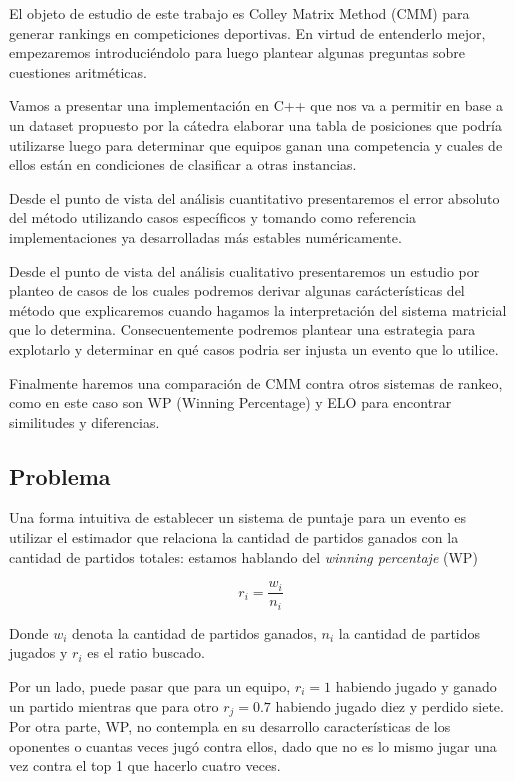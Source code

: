 El objeto de estudio de este trabajo es Colley Matrix Method (CMM) para generar rankings en competiciones deportivas. En virtud de entenderlo mejor, empezaremos introduciéndolo para luego plantear algunas preguntas sobre cuestiones aritméticas.

Vamos a presentar una implementación en C++ que nos va a permitir en base a un dataset propuesto por la cátedra elaborar una tabla de posiciones que podría utilizarse luego para determinar que equipos ganan una competencia y cuales de ellos están en condiciones de clasificar a otras instancias.

Desde el punto de vista del análisis cuantitativo presentaremos el error absoluto del método utilizando casos específicos y tomando como referencia implementaciones ya desarrolladas más estables numéricamente.

Desde el punto de vista del análisis cualitativo presentaremos un estudio por planteo de casos de los cuales podremos derivar algunas carácterísticas del método que explicaremos cuando hagamos la interpretación del sistema matricial que lo determina. Consecuentemente podremos plantear una estrategia para explotarlo y determinar en qué casos podria ser injusta un evento que lo utilice.

Finalmente haremos una comparación de CMM contra otros sistemas de rankeo, como en este caso son WP (Winning Percentage) y ELO para encontrar similitudes y diferencias.

\subsection{Problema}
Una forma intuitiva de establecer un sistema de puntaje para un evento es utilizar el estimador que relaciona la cantidad de partidos ganados con la cantidad de partidos totales: estamos hablando del \textit{winning percentaje} (WP)

\begin{equation}
    r_i = \frac{w_i}{n_i}
\end{equation}

Donde $w_i$ denota la cantidad de partidos ganados, $n_i$ la cantidad de partidos jugados y $r_i$ es el ratio buscado.

Por un lado, puede pasar que para un equipo, $r_i = 1$ habiendo jugado y ganado un partido mientras que para otro $r_j = 0.7$ habiendo jugado diez y perdido siete. Por otra parte, WP, no contempla en su desarrollo características de los oponentes o cuantas veces jugó contra ellos, dado que no es lo mismo jugar una vez contra el top 1 que hacerlo cuatro veces.

